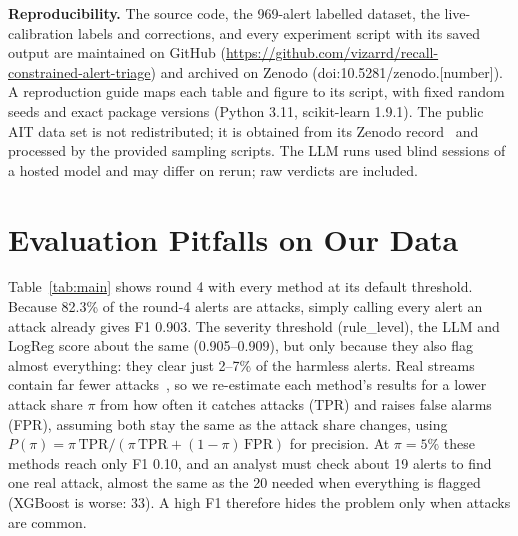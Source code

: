 \documentclass[conference]{IEEEtran}
\begin{document}
\textbf{Reproducibility.} The source code, the 969-alert labelled dataset, the live-calibration labels
and corrections, and every experiment script with its saved output are maintained on GitHub
(\url{https://github.com/vizarrd/recall-constrained-alert-triage}) and archived on Zenodo (doi:10.5281/zenodo.[number]). A
reproduction guide maps each table and figure to its script, with fixed random seeds and exact package
versions (Python 3.11, scikit-learn 1.9.1). The public AIT data set is not redistributed; it is obtained
from its Zenodo record~\cite{ait2023} and processed by the provided sampling scripts. The LLM runs used
blind sessions of a hosted model and may differ on rerun; raw verdicts are included.

\section{Evaluation Pitfalls on Our Data}

Table~\ref{tab:main} shows round 4 with every method at its default threshold. Because 82.3\%
of the round-4 alerts are attacks, simply calling every alert an attack already gives F1 0.903.
The severity threshold (rule\_level), the LLM and LogReg score about the same
(0.905--0.909), but only because they also flag almost everything: they clear just 2--7\% of the
harmless alerts. Real streams contain far fewer attacks~\cite{axelsson2000}, so we re-estimate each method's results
for a lower attack share $\pi$ from how often it catches attacks (TPR) and raises
false alarms (FPR), assuming both stay the same as the attack share changes, using $P(\pi)=\pi\,\mathrm{TPR}/(\pi\,\mathrm{TPR}+(1-\pi)\,\mathrm{FPR})$
for precision. At $\pi=5\%$ these methods reach only F1 0.10, and an analyst must check about 19
alerts to find one real attack, almost the same as the 20 needed when everything is flagged
(XGBoost is worse: 33). A high F1 therefore hides the problem only when attacks are common.
\end{document}
